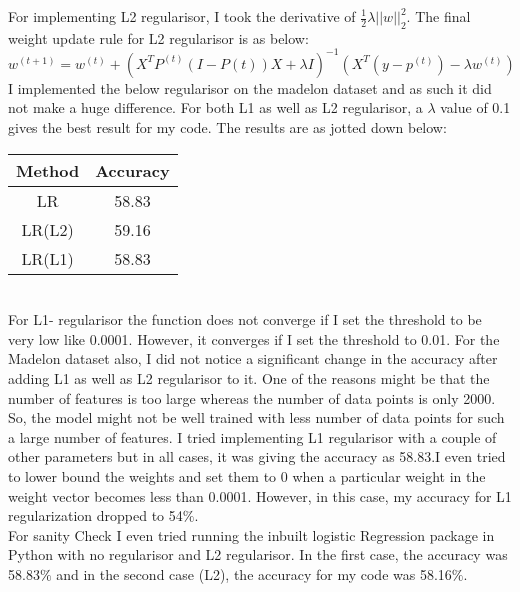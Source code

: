 \documentclass[11pt]{article}
\begin{document}
For implementing L2 regularisor, I took the derivative of $\frac{1}{2}\lambda ||w||_2^{2}$. The final weight update rule for L2 regularisor is as below:\\
$w^{(t+1)}=w^{(t)}+(X^TP^{(t)}(I-P{(t)})X+ \lambda I)^{-1}(X^T(y-p^{(t)})-\lambda w^{(t)})$\\

I implemented the below regularisor on the madelon dataset and as such it did not make a huge difference. For both L1 as well as L2 regularisor, a $\lambda$ value of 0.1 gives the best result for my code.  The results are as jotted down below:\\
\begin{tabular}{|c|c|}
\hline 
Method & Accuracy \\ 
\hline 
LR & 58.83 \\ 
\hline 
LR(L2) & 59.16\\ 
\hline 
LR(L1) & 58.83\\ 
\hline 
\end{tabular} \\

For L1- regularisor the function does not converge if I set the threshold to be very low like 0.0001. However, it converges if I set the threshold to 0.01. For the Madelon dataset also, I did not notice a significant change in the accuracy after adding L1 as well as L2 regularisor to it. One of the reasons might be that the number of features is too large whereas the number of data points is only 2000. So, the model might not be well trained with less number of data points for such a large number of features. I tried implementing L1 regularisor with a couple of other parameters but in all cases, it was giving the accuracy as 58.83.I even tried to lower bound the weights and set them to 0 when a particular weight in the weight vector becomes less than 0.0001. However, in this case, my accuracy for L1 regularization dropped to 54$\%$. \\
For sanity Check I even tried running the inbuilt logistic Regression package in Python with no regularisor and L2 regularisor. In the first case, the accuracy was 58.83$\%$ and in the second case (L2), the accuracy for my code was 58.16$\%$.\\
 
\end{document}
